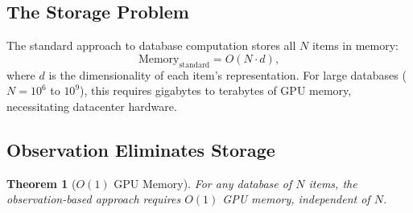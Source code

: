 \documentclass[11pt,twocolumn,a4paper]{article}
\newtheorem{theorem}{Theorem}[section]
\theoremstyle{definition}
\theoremstyle{remark}
\begin{document}
\subsection{The Storage Problem}

The standard approach to database computation stores all $N$ items in memory:
\[
\text{Memory}_{\mathrm{standard}} = O(N \cdot d),
\]
where $d$ is the dimensionality of each item's representation. For large databases ($N = 10^6$ to $10^9$), this requires gigabytes to terabytes of GPU memory, necessitating datacenter hardware.

\subsection{Observation Eliminates Storage}

\begin{theorem}[$O(1)$ GPU Memory]
\label{thm:o1_memory}
For any database of $N$ items, the observation-based approach requires $O(1)$ GPU memory, independent of $N$.
\end{theorem}
\end{document}
